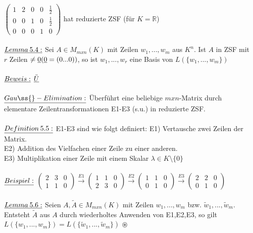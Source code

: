 \documentclass[fleqn, a4paper, 11pt]{article}
\begin{document}
$\begin{pmatrix}
	1 & 2 & 0 & 0 & \tfrac{1}{2} \\
	0 & 0 & 1 & 0 & \tfrac{1}{2} \\
	0 & 0 & 0 & 1 & 0
\end{pmatrix}$ hat reduzierte ZSF (f\"ur $K=\mathbb{R}$)\\
\\
$\uline{Lemma\:5.4:}$ Sei $A\in M_{mxn}(K)$ mit Zeilen $w_1,...,w_m$ aus $K^n$. Ist $A$ in ZSF mit $r$ Zeilen $\neq\uline{0} (\uline{0}=(0...0))$, so ist $w_1,...,w_r$ eine Basis von $L(\{w_1,...,w_m\})$\\
\\
$\uline{Beweis:}$ $\uline{\ddot{U}}$\\
\\
$\uline{Gau\ss{}-Elimination:}$ \"Uberf\"uhrt eine beliebige $mxn$-Matrix durch \dq elementare Zeilentransformationen\dq\: E1-E3 (s.u.) in reduzierte ZSF.\\
\\
$\uline{Definition\:5.5:}$ E1-E3 sind wie folgt definiert: E1) Vertausche zwei Zeilen der Matrix.\\
E2) Addition des Vielfachen einer Zeile zu einer anderen.\\
E3) Multiplikation einer Zeile mit einem Skalar $\lambda\in K\setminus\{0\}$\\
\\
$\uline{Beispiel:}$ $\begin{pmatrix}
	2 & 3 & 0\\
	1 & 1 & 0
\end{pmatrix}\stackrel{E1}{\rightarrow}
\begin{pmatrix}
	1 & 1 & 0\\
	2 & 3 & 0
\end{pmatrix}\stackrel{E2}{\rightarrow}
\begin{pmatrix}
	1 & 1 & 0\\
	0 & 1 & 0
\end{pmatrix}\stackrel{E3}{\rightarrow}
\begin{pmatrix}
	2 & 2 & 0\\
	0 & 1 & 0
\end{pmatrix}$\\
\\
$\uline{Lemma\:5.6:}$ Seien $A,\tilde{A}\in M_{mxn}(K)$ mit Zeilen $w_1,...,w_m$ bzw. $\tilde{w}_1,...,\tilde{w}_m$. Entsteht $\tilde{A}$ aus $A$ durch wiederholtes Anwenden von E1,E2,E3, so gilt $L(\{w_1,...,w_m\})=L(\{\tilde{w}_1,...,\tilde{w}_m\})$ $\circledast$\\
\end{document}
